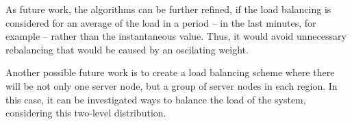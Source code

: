 As future work, the algorithms can be further refined, if the load balancing is considered for an average of the load in a period -- in the last minutes, for example -- rather than the instantaneous value. Thus, it would avoid unnecessary rebalancing that would be caused by an oscilating weight.

Another possible future work is to create a load balancing scheme where there will be not only one server node, but a group of server nodes in each region. In this case, it can be investigated ways to balance the load of the system, considering this two-level distribution.

%



